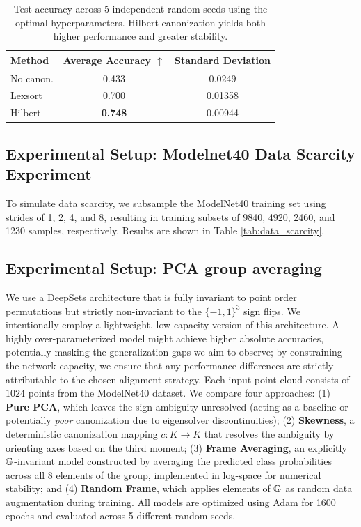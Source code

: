 \begin{table}[h]
\centering
\caption{Test accuracy across 5 independent random seeds using the optimal hyperparameters. Hilbert canonization yields both higher performance and greater stability.}
\label{tab:seed_robustness}
\begin{tabular}{lcc}
\toprule
\textbf{Method} & \textbf{Average Accuracy} $\uparrow$ & \textbf{Standard Deviation} \\
\midrule
No canon. & 0.433 & 0.0249 \\
Lexsort  & 0.700 & 0.01358 \\
Hilbert  & \textbf{0.748} & 0.00944 \\
\bottomrule
\end{tabular}
\end{table}


\subsection{Experimental Setup: Modelnet40 Data Scarcity Experiment}
To simulate data scarcity, we subsample the ModelNet40 training set using strides of 1, 2, 4, and 8, resulting in training subsets of 9840, 4920, 2460, and 1230 samples, respectively. Results are shown in Table  \ref{tab:data_scarcity}.

\subsection{Experimental Setup: PCA group averaging}
\label{subsec:ablation_pca}
We use a DeepSets architecture that is fully invariant to point order permutations but strictly non-invariant to the $\{-1, 1\}^3$ sign flips. We intentionally employ a lightweight, low-capacity version of this architecture. A highly over-parameterized model might achieve higher absolute accuracies, potentially masking the generalization gaps we aim to observe; by constraining the network capacity, we ensure that any performance differences are strictly attributable to the chosen alignment strategy. Each input point cloud consists of $1024$ points from the ModelNet40 dataset. We compare four approaches: (1) \textbf{Pure PCA}, which leaves the sign ambiguity unresolved (acting as a baseline or potentially \emph{poor} canonization due to eigensolver discontinuities); (2) \textbf{Skewness}, a deterministic canonization mapping $c: K \to K$ that resolves the ambiguity by orienting axes based on the third moment; (3) \textbf{Frame Averaging}, an explicitly $\mathbb{G}$-invariant model constructed by averaging the predicted class probabilities across all $8$ elements of the group, implemented in log-space for numerical stability; and (4) \textbf{Random Frame}, which applies elements of $\mathbb{G}$ as random data augmentation during training. All models are optimized using Adam for 1600 epochs and evaluated across 5 different random seeds.

